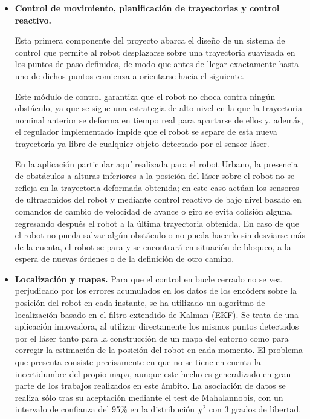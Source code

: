 \begin{itemize}
  \item \textbf{Control de movimiento, planificación de trayectorias y control reactivo.}

  Esta primera componente del proyecto abarca el diseño de un sistema de control que permite al robot desplazarse sobre una trayectoria suavizada en los puntos de paso definidos, de modo que antes de llegar exactamente hasta uno de dichos puntos comienza a orientarse hacia el siguiente.

  Este módulo de control garantiza que el robot no choca contra ningún obstáculo, ya que se sigue una estrategia de alto nivel en la que la trayectoria nominal anterior se deforma en tiempo real para apartarse de ellos y, además, el regulador implementado impide que el robot se separe de esta nueva trayectoria ya libre de cualquier objeto detectado por el sensor láser.

  En la aplicación particular aquí realizada para el robot Urbano, la presencia de obstáculos a alturas inferiores a la posición del láser sobre el robot no se refleja en la trayectoria deformada obtenida; en este caso actúan los sensores de ultrasonidos del robot y mediante control reactivo de bajo nivel basado en comandos de cambio de velocidad de avance o giro se evita colisión alguna, regresando después el robot a la última trayectoria obtenida. En caso de que el robot no pueda salvar algún obstáculo o no pueda hacerlo sin desviarse más de la cuenta, el robot se para y se encontrará en situación de bloqueo, a la espera de nuevas órdenes o de la definición de otro camino.

  \item \textbf{Localización y mapas.}
  Para que el control en bucle cerrado no se vea perjudicado por los errores acumulados en los datos de los encóders sobre la posición del robot en cada instante, se ha utilizado un algoritmo de localización basado en el filtro extendido de Kalman (EKF). Se trata de una aplicación innovadora, al utilizar directamente los mismos puntos detectados por el láser tanto para la construcción de un mapa del entorno como para corregir la estimación de la posición del robot en cada momento. El problema que presenta consiste precisamente en que no se tiene en cuenta la incertidumbre del propio mapa, aunque este hecho es generalizado en gran parte de los trabajos realizados en este ámbito. La asociación de datos se realiza sólo tras su aceptación mediante el test de Mahalannobis, con un intervalo de confianza del 95\% en la distribución $\chi^{2}$ con 3 grados de libertad.


\end{itemize}
